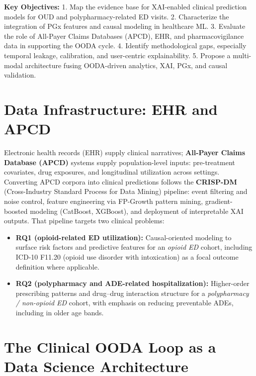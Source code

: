 \documentclass[
  12pt,
]{book}
\providecommand{\tightlist}{%
  \setlength{\itemsep}{0pt}\setlength{\parskip}{0pt}}
\begin{document}
\textbf{Key Objectives:} 1. Map the evidence base for XAI-enabled
clinical prediction models for OUD and polypharmacy-related ED visits.
2. Characterize the integration of PGx features and causal modeling in
healthcare ML. 3. Evaluate the role of All-Payer Claims Databases
(APCD), EHR, and pharmacovigilance data in supporting the OODA cycle. 4.
Identify methodological gaps, especially temporal leakage, calibration,
and user-centric explainability. 5. Propose a multi-modal architecture
fusing OODA-driven analytics, XAI, PGx, and causal validation.

\section{Data Infrastructure: EHR and
APCD}\label{data-infrastructure-ehr-and-apcd}

Electronic health records (EHR) supply clinical narratives;
\textbf{All-Payer Claims Database (APCD)} systems supply
population-level inputs: pre-treatment covariates, drug exposures, and
longitudinal utilization across settings. Converting APCD corpora into
clinical predictions follows the \textbf{CRISP-DM} (Cross-Industry
Standard Process for Data Mining) pipeline: event filtering and noise
control, feature engineering via FP-Growth pattern mining,
gradient-boosted modeling (CatBoost, XGBoost), and deployment of
interpretable XAI outputs. That pipeline targets two clinical problems:

\begin{itemize}
\tightlist
\item
  \textbf{RQ1 (opioid-related ED utilization):} Causal-oriented modeling
  to surface risk factors and predictive features for an \emph{opioid
  ED} cohort, including ICD-10 F11.20 (opioid use disorder with
  intoxication) as a focal outcome definition where applicable.
\item
  \textbf{RQ2 (polypharmacy and ADE-related hospitalization):}
  Higher-order prescribing patterns and drug--drug interaction structure
  for a \emph{polypharmacy / non-opioid ED} cohort, with emphasis on
  reducing preventable ADEs, including in older age bands.
\end{itemize}

\section{The Clinical OODA Loop as a Data Science
Architecture}\label{the-clinical-ooda-loop-as-a-data-science-architecture}
\end{document}
